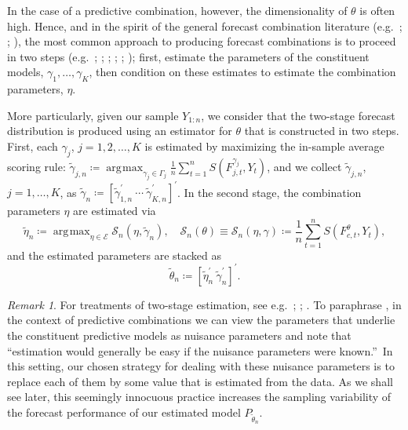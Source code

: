 \documentclass[12pt]{article}
\theoremstyle{definition}
\theoremstyle{remark}
\newtheorem{remark}{Remark}
\DeclareMathOperator*{\argmax}{\arg\!\max}
\begin{document}
{In the case of a predictive combination, however, the dimensionality of $\theta$ is often high. Hence, and in the spirit of the general forecast combination literature (e.g.\ \citealp{Hall2007}; \citealp{Geweke2011}; \citealp{Gneiting2013}), the most common approach to producing forecast combinations is to proceed in two steps (e.g.\ \citealp{Clemen1989}; \citealp{Stock2004}; \citealp{Geweke2011}; \citealp{Genre2013}; \citealp{Makridakis2020}; \citealp{Martin2021}); first, estimate the parameters of the constituent models, $\gamma_{1}, \ldots, \gamma_{K}$, then condition on these estimates to estimate the combination parameters, $\eta$.

More particularly, given our sample $Y_{1:n}$, we consider that the two-stage forecast distribution is produced using an estimator for $\theta$ that is constructed in two steps. First, each $\gamma_j$, $j = 1, 2, \ldots, K$ is estimated by maximizing the in-sample average scoring rule: $\tilde{\gamma}_{j,n} \coloneqq \argmax_{\gamma_j \in \Gamma_j} \frac{1}{n} \sum_{t = 1}^{n} S(F^{\gamma_j}_{j,t}, Y_{t})$, and we collect $\tilde{\gamma}_{j,n}$, $j = 1, \ldots, K$, as $\tilde{\gamma}_{n} \coloneqq [\tilde{\gamma}_{1,n}^{\prime}\ \cdots\ \tilde{\gamma}_{K,n}^{\prime}]^{\prime}$. In the second stage, the combination parameters $\eta$ are estimated via
\begin{equation}
\tilde{\eta}_n \coloneqq \argmax_{\eta \in \mathcal{E}} \mathcal{S}_n(\eta, \tilde{\gamma}_n),\quad \mathcal{S}_{n}(\theta) \equiv \mathcal{S}_{n}(\eta, \gamma) \coloneqq \frac{1}{n} \sum_{t = 1}^n S(F^{\theta}_{c,t}, Y_{t}),
\label{eqn:est2s1}
\end{equation}
and the estimated parameters are stacked as 
\begin{equation}
\tilde{\theta}_n \coloneqq [\tilde{\eta}_n^{\prime}\ \tilde{\gamma}_n^{\prime}]^{\prime}.  \label{eqn:est2s2}
\end{equation}

\begin{remark}
For treatments of two-stage estimation, see e.g.\ \cite{Pagan1986}; \cite{Newey1994}; \cite{Frazier2017}. To paraphrase \cite{Pagan1986}, in the context of predictive combinations we can view the parameters that underlie the constituent predictive models as nuisance parameters and note that \textquotedblleft estimation would generally be easy if the nuisance parameters were known.\textquotedblright\ In this setting, our chosen strategy for dealing with these nuisance parameters is to replace each of them by some value that is estimated from the data. As we shall see later, this seemingly innocuous practice increases the sampling variability of the forecast performance of our estimated model $P_{\tilde{\theta}_{n}}$.
\end{remark}

}
\end{document}
